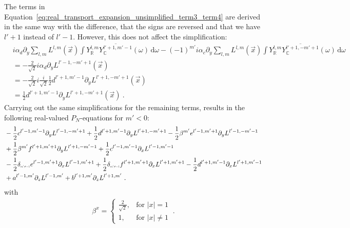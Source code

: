 \documentclass{egpubl}
\newcommand{\ud}{\,\mathrm{d}} %
\newcommand{\SHBC}{Y_{\mathbb{C}}} %
\begin{document}
The terms in Equation~\ref{eq:real_transport_expansion_unsimplified_term3_term4} are derived in the same way with the difference, that the signs are reversed and that we have $l'+1$ instead of $l'-1$. However, this does not affect the simplification:
\begin{align*}
&i\alpha_d\partial_y\sum_{l,m}L^{l,m}\left (\vec{x}\right)\int{Y_{\mathbb{R}}^{l,m}\overline{\SHBC^{l'+1, m'-1}}(\omega )\ud\omega}
-\left({-1}\right)^{m'}i\alpha_c\partial_y\sum_{l,m}L^{l,m}\left (\vec{x}\right)\int{Y_{\mathbb{R}}^{l,m}\overline{\SHBC^{l'+1, -m'+1}}(\omega )\ud\omega}
\\
&=-\frac{2}{\sqrt{2}}i
\alpha_d\partial_y
L^{l'-1,-m'+1}\left (\vec{x}\right)
\\
&=-\frac{2}{\sqrt{2}}i
\frac{i}{\sqrt{2}}\frac{1}{2}d^{{l'+1,m'-1}}
\partial_y
L^{l'+1,-m'+1}\left (\vec{x}\right)
\\
&=
\frac{1}{2}d^{{l'+1,m'-1}}
\partial_y
L^{l'+1,-m'+1}\left (\vec{x}\right) \ .
\end{align*}
Carrying out the same simplifications for the remaining terms, results in the following real-valued $P_N$-equations for $m'<0$:
\begin{align*}
&-\frac{1}{2}c^{{l'-1,m'-1}}
\partial_y
L^{l'-1,-m'+1}
+\frac{1}{2}d^{{l'+1,m'-1}}
\partial_y
L^{l'+1,-m'+1}
-\frac{1}{2}\beta^{m'}e^{{l'-1,m'+1}}
\partial_y
L^{l'-1,-m'-1}
\\&
+\frac{1}{2}\beta^{m'}f^{{l'+1,m'+1}}
\partial_y
L^{l'+1,-m'-1}
+\frac{1}{2}c^{{l'-1,m'-1}}
\partial_x
L^{l'-1,m'-1}
\\&
-\frac{1}{2}\delta_{\scaleto{m'\neq -1}{4pt}}e^{{l'-1,m'+1}}
\partial_x
L^{l'-1,m'+1}
+\frac{1}{2}\delta_{\scaleto{m'\neq -1}{4pt}}f^{{l'+1,m'+1}}
\partial_x
L^{l'+1,m'+1}
-\frac{1}{2}d^{{l'+1,m'-1}}
\partial_x
L^{l'+1,m'-1}
\\&
+a^{{l'-1,m'}}
\partial_z
L^{l'-1,m'}
+b^{{l'+1,m'}}
\partial_z
L^{l'+1,m'} \ .
\end{align*}
with
\begin{align}
\label{eq:real_sh_basis}
\beta^{x}=
\left\{
\begin{array}{lr}
\frac{2}{\sqrt{2}}, & \text{for } \vert x\vert = 1\\
1, & \text{for } \vert x\vert \neq 1
\end{array}
\right. \ .
\end{align}
\end{document}
